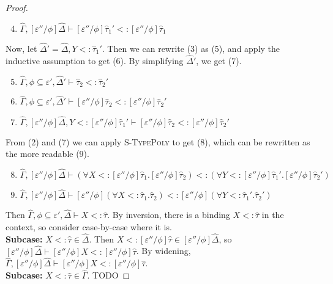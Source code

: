 \documentclass{llncs}
\begin{document}
\begin{proof}
\begin{enumerate}
	\setcounter{enumi}{3}
	\item $\hat \Gamma, [\varepsilon''/\phi]\hat \Delta \vdash [\varepsilon''/\phi]\hat \tau_1' <: [\varepsilon''/\phi]\hat \tau_1$
\end{enumerate}

Now, let $\hat \Delta' = \hat \Delta, Y <: \hat \tau_1'$. Then we can rewrite (3) as (5), and apply the inductive assumption to get (6). By simplifying $\hat \Delta'$, we get (7). 

\begin{enumerate}
	\setcounter{enumi}{4}
	\item $\hat \Gamma, \phi \subseteq \varepsilon', \hat \Delta' \vdash \hat \tau_2 <: \hat \tau_2'$
	\item $\hat \Gamma, \phi \subseteq \varepsilon', \hat \Delta' \vdash [\varepsilon''/\phi]\hat \tau_2 <: [\varepsilon''/\phi]\hat \tau_2'$
	\item $\hat \Gamma, [\varepsilon''/\phi]\hat \Delta, Y <: [\varepsilon''/\phi]\hat \tau_1' \vdash [\varepsilon''/\phi]\hat \tau_2 <: [\varepsilon''/\phi]\hat \tau_2'$
\end{enumerate}

From (2) and (7) we can apply \textsc{S-TypePoly} to get (8), which can be rewritten as the more readable (9).

\begin{enumerate}
	\setcounter{enumi}{7}
	\item $\hat \Gamma, [\varepsilon''/\phi]\hat \Delta \vdash (\forall X <: [\varepsilon''/\phi]\hat \tau_1. [\varepsilon''/\phi]\hat \tau_2) <: (\forall Y <: [\varepsilon''/\phi]\hat \tau_1'. [\varepsilon''/\phi]\hat \tau_2')$
	\item $\hat \Gamma, [\varepsilon''/\phi]\hat \Delta \vdash [\varepsilon''/\phi](\forall X <: \hat \tau_1. \hat \tau_2) <: [\varepsilon''/\phi](\forall Y <: \hat \tau_1'. \hat \tau_2')$
\end{enumerate}

 Then $\hat \Gamma, \phi \subseteq \varepsilon', \hat \Delta \vdash X <: \hat \tau$. By inversion, there is a binding $X <: \hat \tau$ in the context, so consider case-by-case where it is.\\

\textbf{Subcase: } $X <: \hat \tau \in \hat \Delta$. Then $X <: [\varepsilon''/\phi]\hat \tau \in [\varepsilon''/\phi]\hat \Delta$, so $[\varepsilon''/\phi]\hat \Delta \vdash [\varepsilon''/\phi]X <: [\varepsilon''/\phi]\hat \tau$. By widening, $\hat \Gamma, [\varepsilon''/\phi]\hat \Delta \vdash [\varepsilon''/\phi]X <: [\varepsilon''/\phi]\hat \tau$. \\

\textbf{Subcase: } $X <: \hat \tau \in \hat \Gamma$. TODO

\end{proof}
\end{document}
